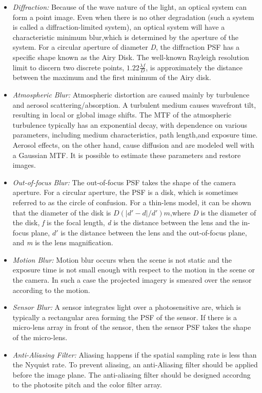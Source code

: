 \documentclass[a4paper]{book}
\begin{document}
	
	\begin{itemize}
		\item \textit{Diffraction:} Because of the wave nature of the light, an optical system can form a point image. Even when there is no other degradation (such a system is called a diffraction-limited system), an optical system will have a characteristic minimum blur,which is determined by the aperture of the system. For a circular aperture of diameter \textit{D}, the diffraction PSF has a specific shape known as the Airy Disk. The well-known Rayleigh resolution limit to discern two discrete points, $1.22\frac{\lambda f}{D} $, is approximately the distance between the maximum and the first minimum of the Airy disk.
		\item \textit{Atmospheric Blur:} Atmospheric distortion are caused mainly by turbulence and aerosol scattering/absorption. A turbulent medium causes wavefront tilt, resulting in local or global image shifts. The MTF of the atmospheric turbulence typically has an exponential decay, with dependence on various parameters, including medium characteristics, path length,and exposure time. Aerosol effects, on the other hand, cause diffusion and are modeled well with a Gaussian MTF. It is possible to estimate these parameters and restore images.
		\item \textit{Out-of-focus Blur:} The out-of-focus PSF takes the shape of the camera aperture. For a circular aperture, the PSF is a disk, which is sometimes referred to as the circle of confusion. For a thin-lens model, it can be shown that the diameter of the disk is $ D(|d' - d|/d')m $,where \textit{D} is the diameter of the disk, \textit{f} is the focal length, \textit{d} is the distance between the lens and the in-focus plane, $ d' $ is the distance between the lens and the out-of-focus plane, and \textit{m} is the lens magnification.
		\item \textit{Motion Blur:} Motion blur occurs when the scene is not static and the exposure time is not small enough with respect to the motion in the scene or the camera. In such a case the projected imagery is smeared over the sensor according to the motion.
		\item \textit{Sensor Blur:} A sensor integrates light over a photosensitive are, which is typically a rectangular area forming the PSF of the sensor. If there is a micro-lens array in front of the sensor, then the sensor PSF takes the shape of the micro-lens.
		\item \textit{Anti-Aliasing Filter:} Aliasing happens if the spatial sampling rate is less than the Nyquist rate. To prevent aliasing, an anti-Aliasing filter should be applied before the image plane. The anti-aliasing filter should be designed accordng to the photosite pitch and the color filter array.

\end{itemize}
\end{document}

